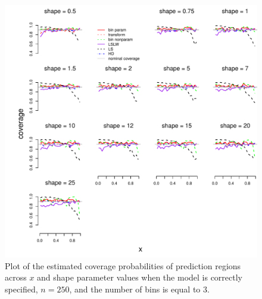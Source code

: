 \documentclass[11pt]{article}\usepackage[]{graphicx}\usepackage[]{color}
\makeatletter
\def\maxwidth{ %
  \ifdim\Gin@nat@width>\linewidth
    \linewidth
  \else
    \Gin@nat@width
  \fi
}
\newenvironment{knitrout}{}{} %
\makeatother
\begin{document}
\newpage
\begin{figure}[h!]
\begin{center}
\begin{knitrout}
\color{fgcolor}
\includegraphics[width=\maxwidth]{figure/Fig-gamma-inx-250-1} 

\end{knitrout}
\end{center}
\caption{Plot of the estimated coverage probabilities of prediction regions 
  across $x$ and shape parameter values when the model is correctly 
  specified, $n = 250$, and the number of bins is equal to $3$.}
\label{Fig:gamma.inx.250}
\end{figure}
\end{document}

